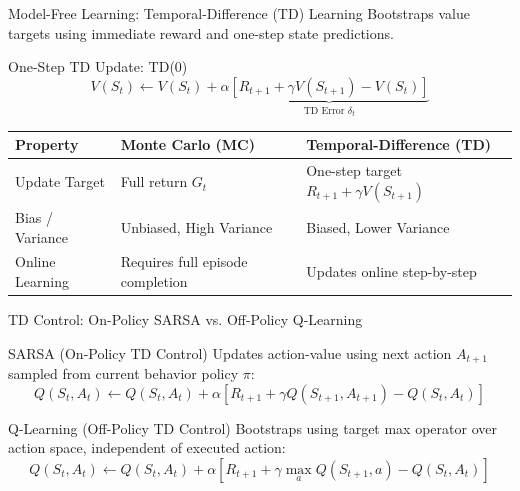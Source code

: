 \documentclass[10pt, aspectratio=169]{beamer}
\begin{document}
\begin{frame}{Model-Free Learning: Temporal-Difference (TD) Learning}
  Bootstraps value targets using immediate reward and one-step state predictions.

  \begin{block}{One-Step TD Update: TD(0)}
    $$V(S_t) \leftarrow V(S_t) + \alpha \underbrace{\left[ R_{t+1} + \gamma V(S_{t+1}) - V(S_t) \right]}_{\text{TD Error } \delta_t}$$
  \end{block}

  \begin{table}
    \small
    \begin{tabular}{lll}
      \toprule
      \textbf{Property} & \textbf{Monte Carlo (MC)} & \textbf{Temporal-Difference (TD)} \\
      \midrule
      Update Target & Full return $G_t$ & One-step target $R_{t+1} + \gamma V(S_{t+1})$ \\
      Bias / Variance & Unbiased, High Variance & Biased, Lower Variance \\
      Online Learning & Requires full episode completion & Updates online step-by-step \\
      \bottomrule
    \end{tabular}
  \end{table}
\end{frame}

\begin{frame}{TD Control: On-Policy SARSA vs. Off-Policy Q-Learning}
  \begin{block}{SARSA (On-Policy TD Control)}
    Updates action-value using next action $A_{t+1}$ sampled from current behavior policy $\pi$:
    $$Q(S_t, A_t) \leftarrow Q(S_t, A_t) + \alpha \left[ R_{t+1} + \gamma Q(S_{t+1}, A_{t+1}) - Q(S_t, A_t) \right]$$
  \end{block}

  \begin{block}{Q-Learning (Off-Policy TD Control)}
    Bootstraps using target max operator over action space, independent of executed action:
    $$Q(S_t, A_t) \leftarrow Q(S_t, A_t) + \alpha \left[ R_{t+1} + \gamma \max_{a} Q(S_{t+1}, a) - Q(S_t, A_t) \right]$$
  \end{block}
\end{frame}
\end{document}
